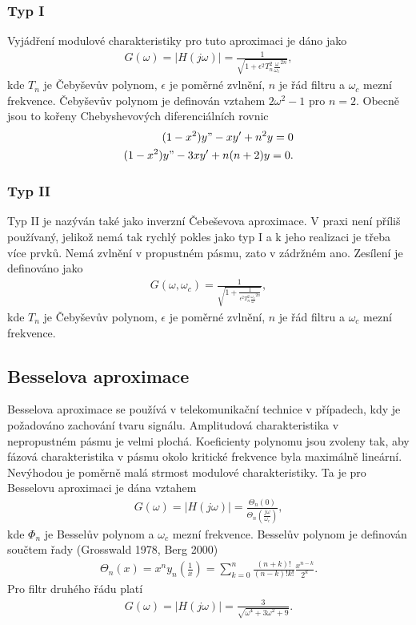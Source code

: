 \documentclass[twoside]{article}
\begin{document}
\subsubsection{Typ I}
Vyjádření modulové charakteristiky pro tuto aproximaci je dáno jako
\begin{align}
G(\omega) = |H(j\omega)| = \frac{1}{\sqrt{1 + \epsilon ^2 T_n ^2 \frac{\omega}{\omega _c}^{2n}}},
\end{align}
kde $T_n$ je Čebyševův polynom, $\epsilon$ je poměrné zvlnění, $n$ je řád filtru a $\omega _c$ mezní frekvence. Čebyševův polynom je definován vztahem $2 \omega ^2 - 1$ pro $n = 2$. Obecně jsou to kořeny Chebyshevových diferenciálních rovnic
\begin{align}
(1 - x^2)y" - xy' + n^2y = 0\\
(1 - x^2)y" - 3xy' + n(n+2)y = 0.
\end{align}
\subsubsection{Typ II}
Typ II je nazýván také jako inverzní Čebeševova aproximace. V praxi není příliš používaný, jelikož nemá tak rychlý pokles jako typ I a k jeho realizaci je třeba více prvků. Nemá zvlnění v propustném pásmu, zato v zádržném ano. Zesílení je definováno jako
\begin{align}
G(\omega, \omega _c) = \frac{1}{\sqrt{1 + \frac{1}{\epsilon ^2 T_n ^2 \frac{\omega _c}{\omega}^{2n}}}},
\end{align}
kde $T_n$ je Čebyševův polynom, $\epsilon$ je poměrné zvlnění, $n$ je řád filtru a $\omega _c$ mezní frekvence.
\subsection{Besselova aproximace}
Besselova aproximace se používá v telekomunikační technice v případech, kdy je požadováno zachování tvaru signálu. Amplitudová charakteristika v nepropustném pásmu je velmi plochá. Koeficienty polynomu jsou zvoleny tak, aby fázová charakteristika v pásmu okolo kritické frekvence byla maximálně lineární. Nevýhodou je poměrně malá strmost modulové charakteristiky. Ta je pro Besselovu aproximaci je dána vztahem
\begin{align}
G(\omega) = |H(j\omega)| = \frac{\Theta _n(0)}{\Theta _n(\frac{j\omega}{\omega _c})},
\end{align}
kde $\Phi _n$ je Besselův polynom a $\omega _c$ mezní frekvence. Besselův polynom je definován součtem řady (Grosswald 1978, Berg 2000)
\begin{align}
\Theta _n (x) = x^n y_n (\frac{1}{x}) = \sum_{k=0}^{n}\frac{(n+k)!}{(n-k)!k!}\frac{x^{n-k}}{2^k}.
\end{align}
Pro filtr druhého řádu platí
\begin{align}
G(\omega) = |H(j\omega)| = \frac{3}{\sqrt{\omega ^4 + 3\omega ^2 + 9}}.
\end{align}
\end{document}
